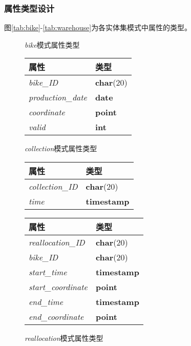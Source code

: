 \subsubsection{属性类型设计}
图\ref{tab:bike}-\ref{tab:warehouse}为各实体集模式中属性的类型。
\begin{figure}[!htp]
    \begin{minipage}{0.3\textwidth}
      \centering
      \caption{\textit{bike}模式属性类型}
      \label{tab:bike}
      \begin{tabular}{ll}\toprule
        属性&类型\\\midrule
       \textit{bike\_ID}&\textbf{char}(20)\\
       \textit{production\_date}&\textbf{date}\\
       \textit{coordinate}&\textbf{point}\\
       \textit{valid}&\textbf{int}\\
       \bottomrule
      \end{tabular}
    \end{minipage}\hfill
    \begin{minipage}{0.3\textwidth}
      \centering
      \caption{\textit{collection}模式属性类型}
      \label{tab:collection}
      \begin{tabular}{ll}\toprule
        属性&类型\\\midrule
       \textit{collection\_ID}&\textbf{char}(20)\\
       \textit{time}&\textbf{timestamp}\\
       \bottomrule
      \end{tabular}
    \end{minipage}\hfill
    \begin{minipage}{0.3\textwidth}
      \centering
      \caption{\textit{reallocation}模式属性类型}
      \label{tab:reallocation}
      \begin{tabular}{ll}\toprule
        属性&类型\\\midrule
       \textit{reallocation\_ID}&\textbf{char}(20)\\
       \textit{bike\_ID}&\textbf{char}(20)\\
       \textit{start\_time}&\textbf{timestamp}\\
       \textit{start\_coordinate}&\textbf{point}\\
       \textit{end\_time}&\textbf{timestamp}\\
       \textit{end\_coordinate}&\textbf{point}\\
       \bottomrule
      \end{tabular}
    \end{minipage}\hfill
  \end{figure}
